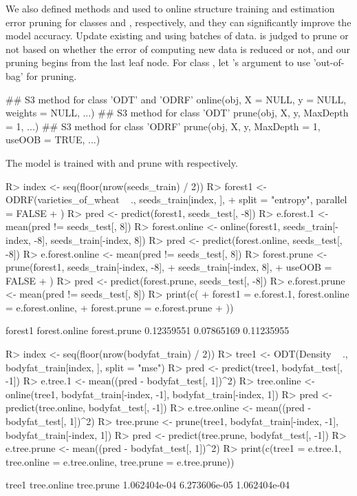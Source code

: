 \documentclass[nojss]{jss}
\newcommand{\fct}[1]{\code{#1()}}
\numberwithin{equation}{section}
\begin{document}
We also defined  methods  and  used to online structure training and estimation error pruning for classes  and , respectively, and they can significantly improve the model accuracy.  Update existing  and  using batches of data.  is judged to prune or not based on whether the error of computing new data is reduced or not, and our pruning begins from the last leaf node. For class , let 's argument  to use 'out-of-bag' for pruning.
\begin{Code}
## S3 method for class 'ODT' and 'ODRF'
online(obj, X = NULL, y = NULL, weights = NULL, ...)
## S3 method for class 'ODT'
prune(obj, X, y, MaxDepth = 1, ...)
## S3 method for class 'ODRF'
prune(obj, X, y, MaxDepth = 1, useOOB = TRUE, ...)
\end{Code}
%
The model is trained with \fct{online} and prune with \fct{prune} respectively.
%
\begin{Schunk}
\begin{Sinput}
R> index <- seq(floor(nrow(seeds_train) / 2))
R> forest1 <- ODRF(varieties_of_wheat ~ ., seeds_train[index, ],
+    split = "entropy", parallel = FALSE
+  )
R> pred <- predict(forest1, seeds_test[, -8])
R> e.forest.1 <- mean(pred != seeds_test[, 8])
R> forest.online <- online(forest1, seeds_train[-index, -8], seeds_train[-index, 8])
R> pred <- predict(forest.online, seeds_test[, -8])
R> e.forest.online <- mean(pred != seeds_test[, 8])
R> forest.prune <- prune(forest1, seeds_train[-index, -8],
+    seeds_train[-index, 8],
+    useOOB = FALSE
+  )
R> pred <- predict(forest.prune, seeds_test[, -8])
R> e.forest.prune <- mean(pred != seeds_test[, 8])
R> print(c(
+    forest1 = e.forest.1, forest.online = e.forest.online,
+    forest.prune = e.forest.prune
+  ))
\end{Sinput}
\begin{Soutput}
      forest1 forest.online  forest.prune 
   0.12359551    0.07865169    0.11235955 
\end{Soutput}
\begin{Sinput}
R> index <- seq(floor(nrow(bodyfat_train) / 2))
R> tree1 <- ODT(Density ~ ., bodyfat_train[index, ], split = "mse")
R> pred <- predict(tree1, bodyfat_test[, -1])
R> e.tree.1 <- mean((pred - bodyfat_test[, 1])^2)
R> tree.online <- online(tree1, bodyfat_train[-index, -1], bodyfat_train[-index, 1])
R> pred <- predict(tree.online, bodyfat_test[, -1])
R> e.tree.online <- mean((pred - bodyfat_test[, 1])^2)
R> tree.prune <- prune(tree1, bodyfat_train[-index, -1], bodyfat_train[-index, 1])
R> pred <- predict(tree.prune, bodyfat_test[, -1])
R> e.tree.prune <- mean((pred - bodyfat_test[, 1])^2)
R> print(c(tree1 = e.tree.1, tree.online = e.tree.online, tree.prune = e.tree.prune))
\end{Sinput}
\begin{Soutput}
       tree1  tree.online   tree.prune 
1.062404e-04 6.273606e-05 1.062404e-04 
\end{Soutput}
\end{Schunk}
\end{document}
